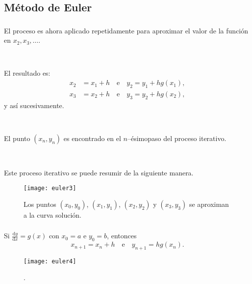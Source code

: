 \subsection{Método de Euler}

\begin{frame}
	\frametitle{\subsecname}
	\begin{minipage}{0.45\paperwidth}
		El proceso es ahora aplicado repetidamente para aproximar el valor de la función en $x_{2},x_{3},\ldots$.

		\

		El resultado es:
		\begin{align*}
		x_{2}&=x_{1}+h\quad\text{e}\quad y_{2}=y_{1}+hg\left(x_{1}\right),\\
		x_{3}&=x_{2}+h\quad\text{e}\quad y_{3}=y_{2}+hg\left(x_{2}\right),
		\end{align*}
		y así sucesivamente.

		\

		El punto $\left(x_{n},y_{n}\right)$ es encontrado en el $n$--ésimo\linebreak paso del proceso iterativo.

		\

		Este proceso iterativo se puede resumir de la \linebreak siguiente manera.
	\end{minipage}
	\hfill
	\begin{minipage}{0.45\paperwidth}
		\begin{figure}
			\centering
			\texttt{[image: euler3]}
			\caption{Los puntos $\left(x_{0},y_{0}\right)$, $\left(x_{1},y_{1}\right)$, $\left(x_{2},y_{2}\right)$ y $\left(x_{3},y_{3}\right)$ se aproximan a la curva solución.}
		\end{figure}
	\end{minipage}
\end{frame}

\begin{frame}
\frametitle{\subsecname}

\begin{minipage}{0.45\paperwidth}
	\begin{theorem}
			Si $\frac{\mathrm{d}y}{\mathrm{d}x}=g\left(x\right)$ con $x_{0}=a$ e $y_{0}=b$, entonces \[ x_{n+1}=x_{n}+h\quad\text{e}\quad y_{n+1}=hg\left(x_{n}\right). \]
	\end{theorem}
\end{minipage}
\hfill
\begin{minipage}{0.45\paperwidth}
	\begin{figure}
		\centering
		\texttt{[image: euler4]}
		\caption{.}
	\end{figure}
\end{minipage}
\end{frame}

